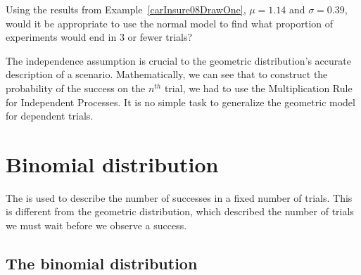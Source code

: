 \begin{exercisewrap}
\begin{nexercise}
Using the results from Example~\ref{carInsure08DrawOne},
$\mu = 1.14$ and $\sigma = 0.39$, would it be appropriate
to use the normal model to find what proportion
of experiments would end in 3 or fewer trials?\footnotemark{}
\end{nexercise}
\end{exercisewrap}

The independence assumption is crucial to the geometric
distribution's accurate description of a scenario.
Mathematically, we can see that to construct the probability
of the success on the $n^{th}$ trial, we had to use the
Multiplication Rule for Independent Processes.
It is no simple task to generalize the geometric model
for dependent trials.




\section{Binomial distribution}
\label{binomialModel}


The 
is used to describe
the number of successes in a fixed number of trials.
This is different from the geometric distribution,
which described the number of trials we must wait before
we observe a success.


\subsection{The binomial distribution}

\newcommand{\insureS}{\resp{not}}
\newcommand{\insureF}{\resp{exceed}}
\newcommand{\insureBinomCinDSingleScenario}{0.103}
\newcommand{\insureBinomCinD}{0.412}
\newcommand{\insureBinomEinHSingleScenario}{0.00454}
\newcommand{\insureBinomEinH}{0.254}
\newcommand{\insureBinomFourtyExpValue}{28}
\newcommand{\insureBinomFourtySD}{2.9}
\newcommand{\insureBinomFourtyLower}{22}
\newcommand{\insureBinomFourtyUpper}{34}

